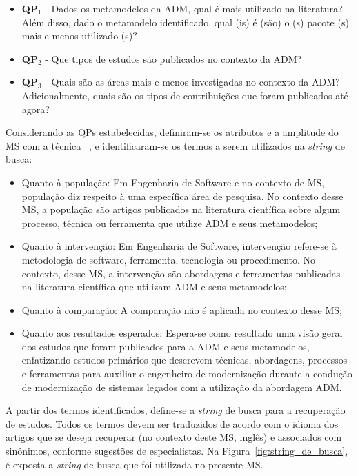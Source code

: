 \begin{itemize}
\item \textbf{QP$_1$} - Dados os metamodelos da ADM, qual é mais utilizado na literatura? Além disso, dado o metamodelo identificado, qual (is) é (são) o (s) pacote (s) mais e menos utilizado (s)?
\item \textbf{QP$_2$} - Que tipos de estudos são publicados no contexto da ADM?
\item \textbf{QP$_3$} - Quais são as áreas mais e menos investigadas no contexto da ADM? Adicionalmente, quais são os tipos de contribuições que foram publicados até agora?
\end{itemize}

Considerando as QPs estabelecidas, definiram-se os atributos e a amplitude do MS com a técnica ~\cite{Kitchenham_2010}, e identificaram-se os termos a serem utilizados na \textit{string} de busca:

\begin{itemize}
\item Quanto à população: Em Engenharia de Software e no contexto de MS, população diz respeito à uma específica área de pesquisa. No contexto desse MS, a população são artigos publicados na literatura científica sobre algum processo, técnica ou ferramenta que utilize ADM e seus metamodelos;

\item Quanto à intervenção: Em Engenharia de Software, intervenção refere-se à metodologia de software, ferramenta, tecnologia ou procedimento. No contexto, desse MS, a intervenção são abordagens e ferramentas publicadas na literatura científica que utilizam ADM e seus metamodelos;

\item Quanto à comparação: A comparação não é aplicada no contexto desse MS;

\item Quanto aos resultados esperados: Espera-se como resultado uma visão geral dos estudos que foram publicados para a ADM e seus metamodelos, enfatizando estudos primários que descrevem técnicas, abordagens, processos e ferramentas para auxiliar o engenheiro de modernização durante a condução de modernização de sistemas legados com a utilização da abordagem ADM.

\end{itemize}

A partir dos termos identificados, define-se a \textit{string} de busca para a recuperação de estudos. Todos os termos devem ser traduzidos de acordo com o idioma dos artigos que se deseja recuperar (no contexto deste MS, inglês) e associados com sinônimos, conforme sugestões de especialistas. Na Figura~\ref{fig:string_de_busca}, é exposta a \textit{string} de busca que foi utilizada no presente MS.

